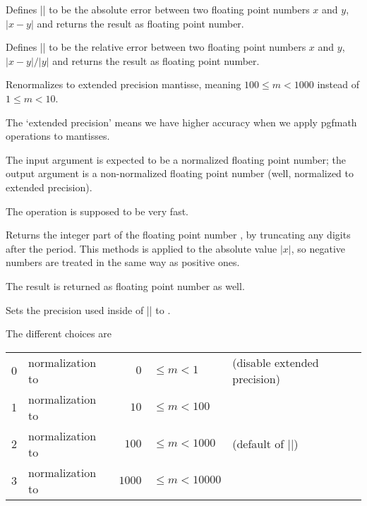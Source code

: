 \begin{command}{\pgfmathfloatabserror{}}
	Defines |\pgfmathresult| to be the absolute error between two floating point numbers $x$ and $y$, $\lvert x - y\rvert $ and returns the result as floating point number.
\end{command}

\begin{command}{\pgfmathfloatrelerror{}}
	Defines |\pgfmathresult| to be the relative error between two floating point numbers $x$ and $y$, $\lvert x - y\rvert / \lvert y \rvert $ and returns the result as floating point number.
\end{command}
\begin{command}{}
Renormalizes  to extended precision mantisse, meaning
$100 \le m < 1000$ instead of $1 \le m < 10$.

The `extended precision' means we have higher accuracy when we apply pgfmath operations to mantisses.

The input argument is expected to be a normalized floating point number; the output argument is a non-normalized floating point number (well, normalized to extended precision).

The operation is supposed to be very fast.
\end{command}
\begin{command}{\pgfmathfloatint{}}
Returns the integer part of the floating point number , by truncating any digits after the period. This methods is applied to the absolute value $\rvert x \lvert$, so negative numbers are treated in the same way as positive ones.

The result is returned as floating point number as well.
\end{command}

\begin{command}{\pgfmathfloatsetextprecision{}}
	Sets the precision used inside of |\pgfmathfloattoextentedprecision| to .

	The different choices are
	
	\begin{tabular}{llrll}
	0 & normalization to &    $0$ & $\le m < 1$ 	& (disable extended precision)\\
	1 & normalization to &   $10$ & $\le m < 100$	\\
	2 & normalization to & 	$100$ & $\le m < 1000$	& (default of |\pgfmathfloattoextentedprecision|)\\
	3 & normalization to & $1000$ & $\le m < 10000$	\\
	\end{tabular}
\end{command}

